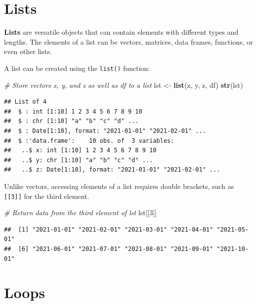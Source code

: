 \documentclass[]{book}
\newenvironment{Shaded}{\begin{snugshade}}{\end{snugshade}}
\newcommand{\CommentTok}[1]{\textcolor[rgb]{0.56,0.35,0.01}{\textit{#1}}}
\newcommand{\DecValTok}[1]{\textcolor[rgb]{0.00,0.00,0.81}{#1}}
\newcommand{\KeywordTok}[1]{\textcolor[rgb]{0.13,0.29,0.53}{\textbf{#1}}}
\newcommand{\NormalTok}[1]{#1}
\newcommand{\StringTok}[1]{\textcolor[rgb]{0.31,0.60,0.02}{#1}}
\begin{document}
\hypertarget{lists}{%
\section{Lists}\label{lists}}

\textbf{Lists} are versatile objects that can contain elements with different types and lengths. The elements of a list can be vectors, matrices, data frames, functions, or even other lists.

A list can be created using the \texttt{list()} function:

\begin{Shaded}
\begin{Highlighting}[]
\CommentTok{# Store vectors x, y, and z as well as df to a list}
\NormalTok{lst <-}\StringTok{ }\KeywordTok{list}\NormalTok{(x, y, z, df)}
\KeywordTok{str}\NormalTok{(lst)}
\end{Highlighting}
\end{Shaded}

\begin{verbatim}
## List of 4
##  $ : int [1:10] 1 2 3 4 5 6 7 8 9 10
##  $ : chr [1:10] "a" "b" "c" "d" ...
##  $ : Date[1:10], format: "2021-01-01" "2021-02-01" ...
##  $ :'data.frame':    10 obs. of  3 variables:
##   ..$ x: int [1:10] 1 2 3 4 5 6 7 8 9 10
##   ..$ y: chr [1:10] "a" "b" "c" "d" ...
##   ..$ z: Date[1:10], format: "2021-01-01" "2021-02-01" ...
\end{verbatim}

Unlike vectors, accessing elements of a list requires double brackets, such as \texttt{{[}{[}3{]}{]}} for the third element.

\begin{Shaded}
\begin{Highlighting}[]
\CommentTok{# Return data from the third element of lst}
\NormalTok{lst[[}\DecValTok{3}\NormalTok{]]}
\end{Highlighting}
\end{Shaded}

\begin{verbatim}
##  [1] "2021-01-01" "2021-02-01" "2021-03-01" "2021-04-01" "2021-05-01"
##  [6] "2021-06-01" "2021-07-01" "2021-08-01" "2021-09-01" "2021-10-01"
\end{verbatim}

\hypertarget{loops}{%
\section{Loops}\label{loops}}
\end{document}

